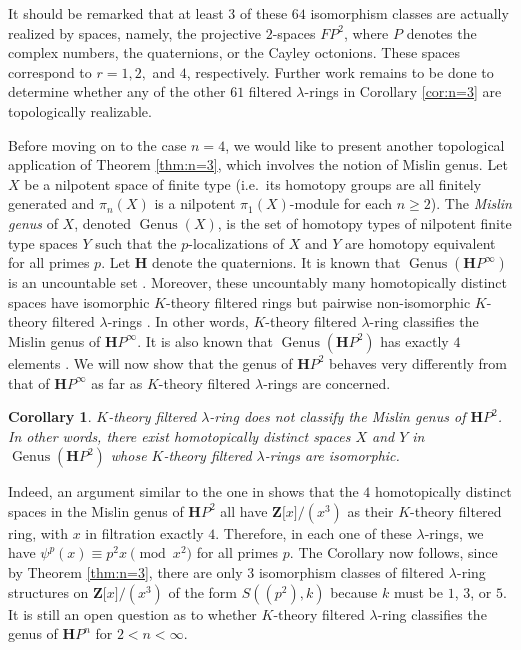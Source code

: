 \documentclass[reqno,11pt]{amsart}
\numberwithin{equation}{subsection}  %
\newtheorem{cor}[subsection]{Corollary}
\newcommand{\bZ}{\mathbf{Z}}
\newcommand{\bH}{\mathbf{H}}
\DeclareMathOperator{\genus}{Genus}
\begin{document}
It should be remarked that at least $3$ of these $64$ isomorphism classes are actually realized by spaces, namely, the projective $2$-spaces $FP^2$, where $P$ denotes the complex numbers, the quaternions, or the Cayley octonions.  These spaces correspond to $r = 1, 2,$ and $4$, respectively.  Further work remains to be done to determine whether any of the other $61$ filtered $\lambda$-rings in Corollary \ref{cor:n=3} are topologically realizable.


Before moving on to the case $n = 4$, we would like to present another topological application of Theorem \ref{thm:n=3}, which involves the notion of Mislin genus.  Let $X$ be a nilpotent space of finite type (i.e.\ its homotopy groups are all finitely generated and $\pi_n(X)$ is a nilpotent $\pi_1(X)$-module for each $n \geq 2$).  The \emph{Mislin genus} of $X$, denoted $\genus(X)$, is the set of homotopy types of nilpotent finite type spaces $Y$ such that the $p$-localizations of $X$ and $Y$ are homotopy equivalent for all primes $p$.  Let $\bH$ denote the quaternions.  It is known that $\genus(\bH P^\infty)$ is an uncountable set \cite{rector}.  Moreover, these uncountably many homotopically distinct spaces have isomorphic $K$-theory filtered rings \cite{yau2} but pairwise non-isomorphic $K$-theory filtered $\lambda$-rings \cite{notbohm}.  In other words, $K$-theory filtered $\lambda$-ring classifies the Mislin genus of $\bH P^\infty$.  It is also known that $\genus(\bH P^2)$ has exactly $4$ elements \cite{mcgibbon}.  We will now show that the genus of $\bH P^2$ behaves very differently from that of $\bH P^\infty$ as far as $K$-theory filtered $\lambda$-rings are concerned.


\medskip
\begin{cor}
\label{cor2:n=3}
$K$-theory filtered $\lambda$-ring does not classify the Mislin genus of $\bH P^2$.  In other words, there exist homotopically distinct spaces $X$ and $Y$ in $\genus(\bH P^2)$ whose $K$-theory filtered $\lambda$-rings are isomorphic.
\end{cor}


Indeed, an argument similar to the one in \cite{yau2} shows that the $4$ homotopically distinct spaces in the Mislin genus of $\bH P^2$ all have $\bZ \lbrack x \rbrack/(x^3)$ as their $K$-theory filtered ring, with $x$ in filtration exactly $4$.  Therefore, in each one of these $\lambda$-rings, we have $\psi^p(x) \equiv p^2 x \pmod{x^2}$ for all primes $p$.  The Corollary now follows, since by Theorem \ref{thm:n=3}, there are only $3$ isomorphism classes of filtered $\lambda$-ring structures on $\bZ \lbrack x \rbrack/(x^3)$ of the form $S((p^2), k)$ because $k$ must be $1$, $3$, or $5$.  It is still an open question as to whether $K$-theory filtered $\lambda$-ring classifies the genus of $\bH P^n$ for $2 < n < \infty$.
\end{document}
